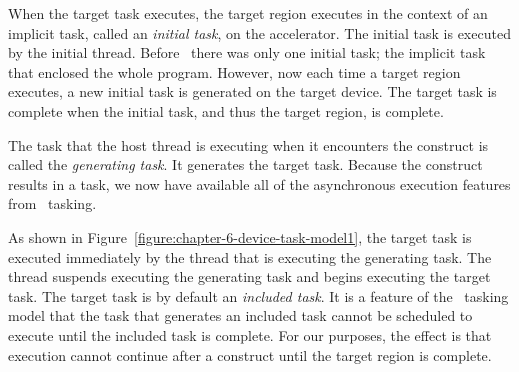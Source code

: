 When the target task executes, the target region executes in the context of an
implicit task, called an \emph{initial task}, on the accelerator.  The initial
task is executed by the initial thread.  Before \OMPfourzero\, there was only one
initial task; the implicit task that enclosed the whole program.  However, now each
time a target region executes, a new initial task is generated on the target
device.  The target task is complete when the initial task, and thus the target
region, is complete.

The task that the host thread is executing when it encounters the 
construct is called the \emph{generating task}.  It generates the target task.
Because the  construct results in a task, we now have available
all of the asynchronous execution features from \OMP\ tasking.

\begin{figure*}[!tb]
\centering
{}
\caption{ \textbf{The target task as an included task} -- \small
        By default, the target task is an included task.  The
        generating task cannot resume until the included target
        task is complete.  The target task completes when the
        implicit task that contains the target region is completed
        by the initial thread running on an accelerator.
        }
\label{figure:chapter-6-device-task-model1}
\end{figure*}

As shown in Figure~\ref{figure:chapter-6-device-task-model1}, the target
task is executed immediately by the thread that is executing the generating
task.  The thread suspends executing the generating task and begins executing
the target task.  The target task is by default an \emph{included task}.  It is
a feature of the \OMP\ tasking model that the task that generates an included
task cannot be scheduled to execute until the included task is complete.  For
our purposes, the effect is that execution cannot continue after a
 construct until the target region is complete.

\begin{figure*}[!tb]
\centering
{}
\caption{ \textbf{The target task as a deferrable task} -- \small
        The nowait clause makes the target task a deferrable task.  The
        generating task may now be scheduled to execute before the target
        task is complete.  The effect is that the generating task may
        execute in parallel with the target task.
        }
\label{figure:chapter-6-device-task-model2}
\end{figure*}

